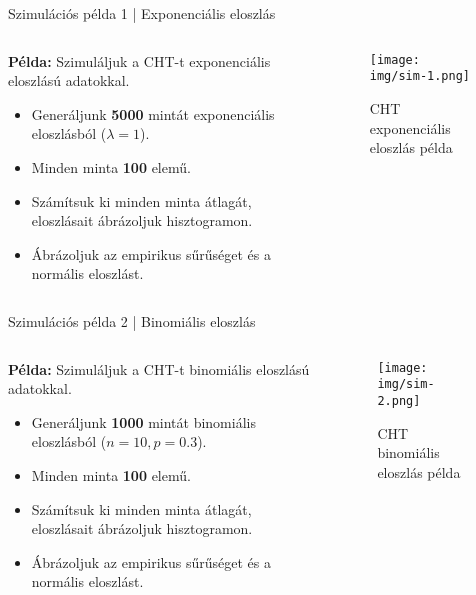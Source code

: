 \documentclass[aspectratio=169,12pt]{beamer}
\begin{document}
	\begin{frame}{Szimulációs példa 1 | Exponenciális eloszlás}
		\begin{columns}
			\begin{column}{0.5\textwidth}
				\textbf{Példa:} Szimuláljuk a CHT-t exponenciális eloszlású adatokkal.
				\begin{itemize}
					\item Generáljunk \textbf{5000} mintát exponenciális eloszlásból (\(\lambda = 1\)).
					\item Minden minta \textbf{100} elemű.
					\item Számítsuk ki minden minta átlagát, eloszlásait ábrázoljuk hisztogramon.
					\item Ábrázoljuk az empirikus sűrűséget és a normális eloszlást.
				\end{itemize}
			\end{column}
			\begin{column}{0.5\textwidth}
				\begin{figure}
					\texttt{[image: img/sim-1.png]}
					\caption{CHT exponenciális eloszlás példa}
				\end{figure}
			\end{column}
		\end{columns}
	\end{frame}
	
	\begin{frame}{Szimulációs példa 2 | Binomiális eloszlás}
		\begin{columns}
			\begin{column}{0.5\textwidth}
				\textbf{Példa:} Szimuláljuk a CHT-t binomiális eloszlású adatokkal.
				\begin{itemize}
					\item Generáljunk \textbf{1000} mintát binomiális eloszlásból (\(n=10, p=0.3\)).
					\item Minden minta \textbf{100} elemű.
					\item Számítsuk ki minden minta átlagát, eloszlásait ábrázoljuk hisztogramon.
					\item Ábrázoljuk az empirikus sűrűséget és a normális eloszlást.
				\end{itemize}
			\end{column}
			\begin{column}{0.5\textwidth}
				\begin{figure}
					\texttt{[image: img/sim-2.png]}
					\caption{CHT binomiális eloszlás példa}
				\end{figure}
			\end{column}
		\end{columns}
	\end{frame}
	
\end{document}
